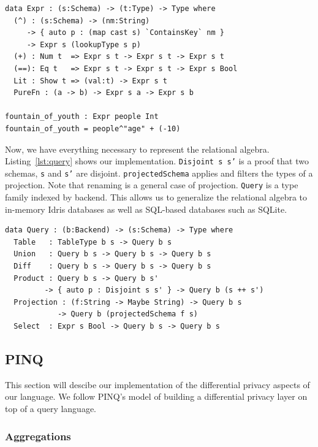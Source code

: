 \documentclass[12pt]{article}
\begin{document}
\begin{lstlisting}[label={lst:expr},caption=Representing typed expressions]
data Expr : (s:Schema) -> (t:Type) -> Type where
  (^) : (s:Schema) -> (nm:String)
     -> { auto p : (map cast s) `ContainsKey` nm }
     -> Expr s (lookupType s p)
  (+) : Num t  => Expr s t -> Expr s t -> Expr s t
  (==): Eq t   => Expr s t -> Expr s t -> Expr s Bool
  Lit : Show t => (val:t) -> Expr s t
  PureFn : (a -> b) -> Expr s a -> Expr s b

fountain_of_youth : Expr people Int
fountain_of_youth = people^"age" + (-10)
\end{lstlisting}

Now, we have everything necessary to represent the relational algebra.
Listing~\ref{lst:query} shows our implementation.
\texttt{Disjoint s s'} is a proof that two schemas, \texttt{s} and \texttt{s'} are disjoint.
\texttt{projectedSchema} applies and filters the types of a projection.
Note that renaming is a general case of projection.
\texttt{Query} is a type family indexed by backend.
This allows us to generalize the relational algebra to in-memory Idris databases as well as SQL-based databases such as SQLite.

\begin{lstlisting}[label={lst:query},caption=Representing typed queries]
data Query : (b:Backend) -> (s:Schema) -> Type where
  Table   : TableType b s -> Query b s
  Union   : Query b s -> Query b s -> Query b s
  Diff    : Query b s -> Query b s -> Query b s
  Product : Query b s -> Query b s'
         -> { auto p : Disjoint s s' } -> Query b (s ++ s')
  Projection : (f:String -> Maybe String) -> Query b s
            -> Query b (projectedSchema f s)
  Select  : Expr s Bool -> Query b s -> Query b s
\end{lstlisting}


\subsection{PINQ}\label{sec:pinq}

This section will descibe our implementation of the differential privacy aspects of our language. We follow PINQ's model of building a differential privacy layer on top of a query language.

\subsubsection{Aggregations}\label{sec:pinq:aggregations}
\end{document}

